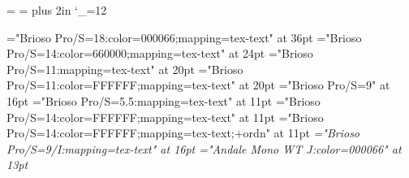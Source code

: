 
\hoffset=-1in
\voffset=-1in
\newdimen\width \width=512bp
\newdimen\height \height=384bp

\def\plainoutput{\shipout\vbox to \height{\hrule\vss
 \hbox to \width{\vrule \hfil
  \vbox to \height {\makeheadline \pagebody \makefootline \vfil}\hfil\vrule}\vss\hrule}
 \advancepageno \ifnum 
 \outputpenalty >-20000 \else \dosupereject \fi}

\def\={\output={\partialslideout}\vfill\eject \output={\plainoutput}}
\def\partialslideout{\setbox\savepage=\vbox{\unvcopy255\unskip}\plainoutput
 \global\output={\plainoutput}\unvbox\savepage}
\newbox\savepage

\let\=\relax %

\raggedbottom
\frenchspacing

\height
{}=\smallskipamount
\parskip=
\rightskip=0pt plus 2in
\catcode`\_=12

\def\fontfam{Brioso Pro}

\font\A="\fontfam/S=18:color=000066;mapping=tex-text" at 36pt
\font\B="\fontfam/S=14:color=660000;mapping=tex-text" at 24pt
\font\C="\fontfam/S=11:mapping=tex-text" at 20pt
\font\Cw="\fontfam/S=11:color=FFFFFF;mapping=tex-text" at 20pt
\font\D="\fontfam/S=9" at 16pt
\font\E="\fontfam/S=5.5:mapping=tex-text" at 11pt
\font\Ew="\fontfam/S=14:color=FFFFFF;mapping=tex-text" at 11pt
\font\EwOrd="\fontfam/S=14:color=FFFFFF;mapping=tex-text;+ordn" at 11pt
\font\it="\fontfam/S=9/I:mapping=tex-text" at 16pt
\font\verbfont="Andale Mono WT J:color=000066" at 13pt

\def\slide#1{\vfill\eject
  \line{\hss \special{x:rulecolor=000066}\vrule height 30pt width \width\special{x:rulecolor}\hss}
  \vskip-26pt\line{\Cw \runheadtext\hfil}
  \vskip16pt\line{\B #1\hfil}}

\def\item{\par\kern\smallskipamount
  \C \noindent \hbox to \parindent{\hfil • }\hangindent\parindent \hangafter1 }
\def\subitem{\par\D \noindent \hbox to 2\parindent{\hfil • }\hangindent2\parindent \hangafter1 }

\def\TeX{\leavevmode$\smash{\hbox{T\kern-.1667em\lower.5ex\hbox{E}\kern-.125em X}}$}
\def\LaTeX{\leavevmode$\smash{\hbox{L\raise.4ex\hbox{\kern-.25em
   \special{x:gsave}\special{x:scale .72 .72}A\special{x:grestore}\kern-.3333em}\TeX}}$}

